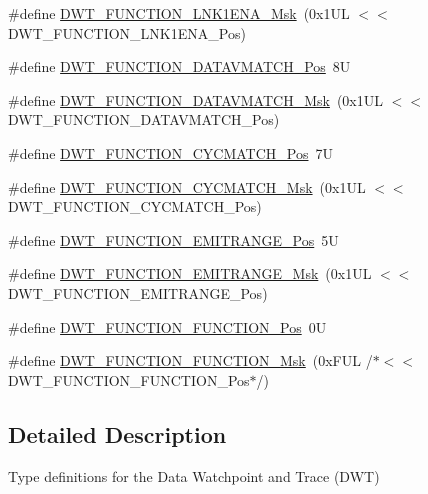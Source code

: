 \begin{DoxyCompactItemize}
\item 
\#define \hyperlink{group___c_m_s_i_s___d_w_t_ga64bd419260c3337cacf93607d1ad27ac}{D\+W\+T\+\_\+\+F\+U\+N\+C\+T\+I\+O\+N\+\_\+\+L\+N\+K1\+E\+N\+A\+\_\+\+Msk}~(0x1\+U\+L $<$$<$ D\+W\+T\+\_\+\+F\+U\+N\+C\+T\+I\+O\+N\+\_\+\+L\+N\+K1\+E\+N\+A\+\_\+\+Pos)
\item 
\#define \hyperlink{group___c_m_s_i_s___d_w_t_ga106f3672cd4be7c7c846e20497ebe5a6}{D\+W\+T\+\_\+\+F\+U\+N\+C\+T\+I\+O\+N\+\_\+\+D\+A\+T\+A\+V\+M\+A\+T\+C\+H\+\_\+\+Pos}~8U
\item 
\#define \hyperlink{group___c_m_s_i_s___d_w_t_ga32af1f1c0fcd2d8d9afd1ad79cd9970e}{D\+W\+T\+\_\+\+F\+U\+N\+C\+T\+I\+O\+N\+\_\+\+D\+A\+T\+A\+V\+M\+A\+T\+C\+H\+\_\+\+Msk}~(0x1\+U\+L $<$$<$ D\+W\+T\+\_\+\+F\+U\+N\+C\+T\+I\+O\+N\+\_\+\+D\+A\+T\+A\+V\+M\+A\+T\+C\+H\+\_\+\+Pos)
\item 
\#define \hyperlink{group___c_m_s_i_s___d_w_t_ga4b65d79ca37ae8010b4a726312413efd}{D\+W\+T\+\_\+\+F\+U\+N\+C\+T\+I\+O\+N\+\_\+\+C\+Y\+C\+M\+A\+T\+C\+H\+\_\+\+Pos}~7U
\item 
\#define \hyperlink{group___c_m_s_i_s___d_w_t_ga8e2ed09bdd33a8f7f7ce0444f5f3bb25}{D\+W\+T\+\_\+\+F\+U\+N\+C\+T\+I\+O\+N\+\_\+\+C\+Y\+C\+M\+A\+T\+C\+H\+\_\+\+Msk}~(0x1\+U\+L $<$$<$ D\+W\+T\+\_\+\+F\+U\+N\+C\+T\+I\+O\+N\+\_\+\+C\+Y\+C\+M\+A\+T\+C\+H\+\_\+\+Pos)
\item 
\#define \hyperlink{group___c_m_s_i_s___d_w_t_ga41d5b332216baa8d29561260a1b85659}{D\+W\+T\+\_\+\+F\+U\+N\+C\+T\+I\+O\+N\+\_\+\+E\+M\+I\+T\+R\+A\+N\+G\+E\+\_\+\+Pos}~5U
\item 
\#define \hyperlink{group___c_m_s_i_s___d_w_t_gad46dd5aba29f2e28d4d3f50b1d291f41}{D\+W\+T\+\_\+\+F\+U\+N\+C\+T\+I\+O\+N\+\_\+\+E\+M\+I\+T\+R\+A\+N\+G\+E\+\_\+\+Msk}~(0x1\+U\+L $<$$<$ D\+W\+T\+\_\+\+F\+U\+N\+C\+T\+I\+O\+N\+\_\+\+E\+M\+I\+T\+R\+A\+N\+G\+E\+\_\+\+Pos)
\item 
\#define \hyperlink{group___c_m_s_i_s___d_w_t_ga5797b556edde2bbaa4d33dcdb1a891bb}{D\+W\+T\+\_\+\+F\+U\+N\+C\+T\+I\+O\+N\+\_\+\+F\+U\+N\+C\+T\+I\+O\+N\+\_\+\+Pos}~0U
\item 
\#define \hyperlink{group___c_m_s_i_s___d_w_t_ga3b2cda708755ecf5f921d08b25d774d1}{D\+W\+T\+\_\+\+F\+U\+N\+C\+T\+I\+O\+N\+\_\+\+F\+U\+N\+C\+T\+I\+O\+N\+\_\+\+Msk}~(0x\+F\+U\+L /$\ast$$<$$<$ D\+W\+T\+\_\+\+F\+U\+N\+C\+T\+I\+O\+N\+\_\+\+F\+U\+N\+C\+T\+I\+O\+N\+\_\+\+Pos$\ast$/)
\end{DoxyCompactItemize}


\subsection{Detailed Description}
Type definitions for the Data Watchpoint and Trace (D\+WT) 



